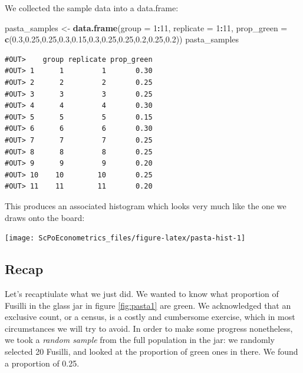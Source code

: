 \documentclass[]{book}
\newenvironment{Shaded}{\begin{snugshade}}{\end{snugshade}}
\newcommand{\KeywordTok}[1]{\textcolor[rgb]{0.13,0.29,0.53}{\textbf{#1}}}
\newcommand{\DataTypeTok}[1]{\textcolor[rgb]{0.13,0.29,0.53}{#1}}
\newcommand{\DecValTok}[1]{\textcolor[rgb]{0.00,0.00,0.81}{#1}}
\newcommand{\FloatTok}[1]{\textcolor[rgb]{0.00,0.00,0.81}{#1}}
\newcommand{\StringTok}[1]{\textcolor[rgb]{0.31,0.60,0.02}{#1}}
\newcommand{\OperatorTok}[1]{\textcolor[rgb]{0.81,0.36,0.00}{\textbf{#1}}}
\newcommand{\NormalTok}[1]{#1}
\begin{document}
We collected the sample data into a data.frame:

\begin{Shaded}
\begin{Highlighting}[]
\NormalTok{pasta_samples <-}\StringTok{ }\KeywordTok{data.frame}\NormalTok{(}\DataTypeTok{group =} \DecValTok{1}\OperatorTok{:}\DecValTok{11}\NormalTok{, }\DataTypeTok{replicate =} \DecValTok{1}\OperatorTok{:}\DecValTok{11}\NormalTok{, }\DataTypeTok{prop_green =} \KeywordTok{c}\NormalTok{(}\FloatTok{0.3}\NormalTok{,}\FloatTok{0.25}\NormalTok{,}\FloatTok{0.25}\NormalTok{,}\FloatTok{0.3}\NormalTok{,}\FloatTok{0.15}\NormalTok{,}\FloatTok{0.3}\NormalTok{,}\FloatTok{0.25}\NormalTok{,}\FloatTok{0.25}\NormalTok{,}\FloatTok{0.2}\NormalTok{,}\FloatTok{0.25}\NormalTok{,}\FloatTok{0.2}\NormalTok{))}
\NormalTok{pasta_samples}
\end{Highlighting}
\end{Shaded}

\begin{verbatim}
#OUT>    group replicate prop_green
#OUT> 1      1         1       0.30
#OUT> 2      2         2       0.25
#OUT> 3      3         3       0.25
#OUT> 4      4         4       0.30
#OUT> 5      5         5       0.15
#OUT> 6      6         6       0.30
#OUT> 7      7         7       0.25
#OUT> 8      8         8       0.25
#OUT> 9      9         9       0.20
#OUT> 10    10        10       0.25
#OUT> 11    11        11       0.20
\end{verbatim}

This produces an associated histogram which looks very much like the one
we draws onto the board:

\begin{center}\texttt{[image: ScPoEconometrics\_files/figure-latex/pasta-hist-1]} \end{center}

\subsection{Recap}\label{recap}

Let's recaptiulate what we just did. We wanted to know what proportion
of Fusilli in the glass jar in figure \ref{fig:pasta1} are green. We
acknowledged that an exclusive count, or a census, is a costly and
cumbersome exercise, which in most circumstances we will try to avoid.
In order to make some progress nonetheless, we took a \emph{random
sample} from the full population in the jar: we randomly selected 20
Fusilli, and looked at the proportion of green ones in there. We found a
proportion of 0.25.
\end{document}
